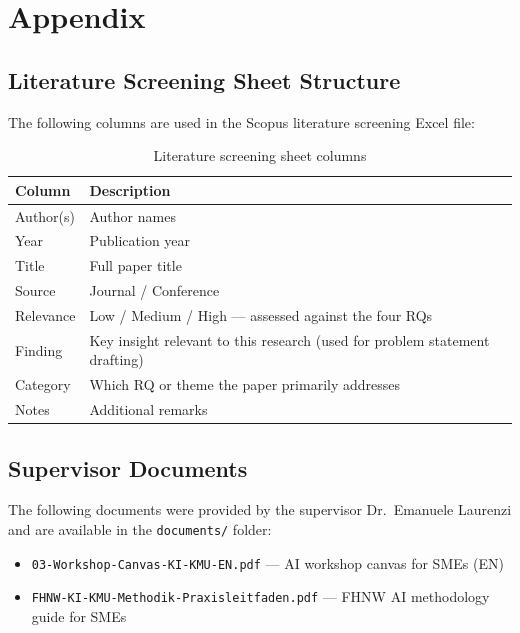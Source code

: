 \chapter{Appendix}
\label{app:proposal}

\section{Literature Screening Sheet Structure}
\label{app:screening}

The following columns are used in the Scopus literature screening Excel file:

\begin{table}[htbp]
  \centering
  \caption{Literature screening sheet columns}
  \begin{tabular}{@{}lp{9cm}@{}}
    \toprule
    \textbf{Column} & \textbf{Description} \\
    \midrule
    Author(s)   & Author names \\
    Year        & Publication year \\
    Title       & Full paper title \\
    Source      & Journal / Conference \\
    Relevance   & Low / Medium / High — assessed against the four RQs \\
    Finding     & Key insight relevant to this research (used for problem statement drafting) \\
    Category    & Which RQ or theme the paper primarily addresses \\
    Notes       & Additional remarks \\
    \bottomrule
  \end{tabular}
\end{table}

\section{Supervisor Documents}
\label{app:supervisor_docs}

The following documents were provided by the supervisor Dr.\ Emanuele Laurenzi and are available in the \texttt{documents/} folder:

\begin{itemize}
  \item \texttt{03-Workshop-Canvas-KI-KMU-EN.pdf} — AI workshop canvas for SMEs (EN)
  \item \texttt{FHNW-KI-KMU-Methodik-Praxisleitfaden.pdf} — FHNW AI methodology guide for SMEs
\end{itemize}
